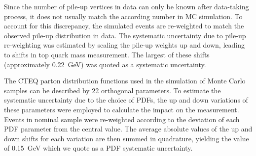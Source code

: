 \begin{description}[wide=\parindent]




\item [Pile-up.]
Since the number of pile-up vertices in data can only be known after data-taking process, it does not usually match the
according number in MC simulation. To account for this discrepancy, the simulated events are re-weighted to match the
observed pile-up distribution in data. The systematic uncertainty due to pile-up re-weighting was estimated by
scaling the pile-up weights up and down, leading to shifts in top quark mass measurement. The largest of these shifts
(approximately \SI{0.22}{\GeV}) was quoted as a systematic uncertainty.

\item [Parton distribution functions.]
The CTEQ parton distribution functions \autocite{CTEQ} used in the simulation of Monte Carlo samples can be described by
22 orthogonal parameters. To estimate the systematic uncertainty due to the choice of PDFs, the up and down variations
of these parameters were employed to calculate the impact on the measurement. Events in nominal \ttjets sample were
re-weighted according to the deviation of each PDF parameter from the central value. The average absolute values of the
up and down shifts for each variation are then summed in quadrature, yielding the value of \SI{0.15}{\GeV} which we
quote as a PDF systematic uncertainty.


\end{description}
